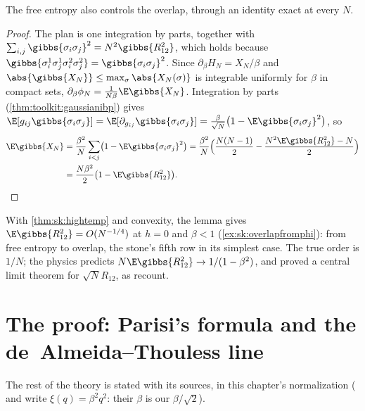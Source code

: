 \begin{refsection}
The free entropy also controls the overlap, through an identity exact at every $N$.


\begin{proof}
The plan is one integration by parts, together with $\sum_{i,j}\gibbs{\sigma_i\sigma_j}^2=N^2\gibbs{R_{12}^2}$, which holds because $\gibbs{\sigma^1_i\sigma^1_j\sigma^2_i\sigma^2_j}=\gibbs{\sigma_i\sigma_j}^2$. Since $\partial_\beta H_N=X_N/\beta$ and $\abs{\gibbs{X_N}}\le\max_\sigma\abs{X_N(\sigma)}$ is integrable uniformly for $\beta$ in compact sets, $\partial_\beta\phi_N=\frac1{N\beta}\E\gibbs{X_N}$. Integration by parts (\cref{thm:toolkit:gaussianibp}) gives $\E[g_{ij}\gibbs{\sigma_i\sigma_j}]=\E[\partial_{g_{ij}}\gibbs{\sigma_i\sigma_j}]=\frac\beta{\sqrt N}\bigl(1-\E\gibbs{\sigma_i\sigma_j}^2\bigr)$, so
\begin{align*}
\E\gibbs{X_N}&=\frac{\beta^2}N\sum_{i<j}\bigl(1-\E\gibbs{\sigma_i\sigma_j}^2\bigr)=\frac{\beta^2}N\Bigl(\frac{N(N-1)}2-\frac{N^2\E\gibbs{R_{12}^2}-N}2\Bigr)\\
&=\frac{N\beta^2}2\bigl(1-\E\gibbs{R_{12}^2}\bigr).\qedhere
\end{align*}
\end{proof}

With \cref{thm:sk:hightemp} and convexity, the lemma gives $\E\gibbs{R_{12}^2}=O(N^{-1/4})$ at $h=0$ and $\beta<1$ (\cref{ex:sk:overlapfromphi}): from free entropy to overlap, the stone's fifth row in its simplest case. The true order is $1/N$; the physics predicts $N\E\gibbs{R_{12}^2}\to1/(1-\beta^2)$, and \textcite{AizenmanLebowitzRuelle1987} proved a central limit theorem for $\sqrt NR_{12}$, as \textcite{KusuokaNakajima2026b} recount.

\section{The proof: Parisi's formula and the de~Almeida--Thouless line}\label{sec:sk:beyond}

The rest of the theory is stated with its sources, in this chapter's normalization (\textcite{Panchenko2013b} and \textcite{AuffingerChen2015a} write $\xi(q)=\beta^2q^2$: their $\beta$ is our $\beta/\sqrt2$).


\end{refsection}
